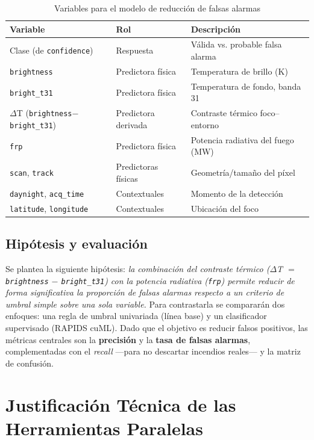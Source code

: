\begin{table}[t]
\caption{Variables para el modelo de reducción de falsas alarmas}
\label{tab:variables}
\centering
\renewcommand{\arraystretch}{1.3}
\begin{tabular}{p{2.3cm} p{2.0cm} p{2.9cm}}
\toprule
\textbf{Variable} & \textbf{Rol} & \textbf{Descripción} \\
\midrule
Clase (de \texttt{confidence}) & Respuesta & Válida vs. probable falsa alarma \\
\texttt{brightness} & Predictora física & Temperatura de brillo (K) \\
\texttt{bright\_t31} & Predictora física & Temperatura de fondo, banda 31 \\
$\Delta$T (\texttt{brightness}$-$\texttt{bright\_t31}) & Predictora derivada & Contraste térmico foco--entorno \\
\texttt{frp} & Predictora física & Potencia radiativa del fuego (MW) \\
\texttt{scan}, \texttt{track} & Predictoras físicas & Geometría/tamaño del píxel \\
\texttt{daynight}, \texttt{acq\_time} & Contextuales & Momento de la detección \\
\texttt{latitude}, \texttt{longitude} & Contextuales & Ubicación del foco \\
\bottomrule
\end{tabular}
\end{table}

\subsection{Hipótesis y evaluación}
Se plantea la siguiente hipótesis: \textit{la combinación del contraste térmico ($\Delta$T $=$ \texttt{brightness} $-$ \texttt{bright\_t31}) con la potencia radiativa (\texttt{frp}) permite reducir de forma significativa la proporción de falsas alarmas respecto a un criterio de umbral simple sobre una sola variable.} Para contrastarla se compararán dos enfoques: una regla de umbral univariada (línea base) y un clasificador supervisado (RAPIDS cuML). Dado que el objetivo es reducir falsos positivos, las métricas centrales son la \textbf{precisión} y la \textbf{tasa de falsas alarmas}, complementadas con el \textit{recall} —para no descartar incendios reales— y la matriz de confusión.

\section{Justificación Técnica de las Herramientas Paralelas}
\label{sec:tools}

